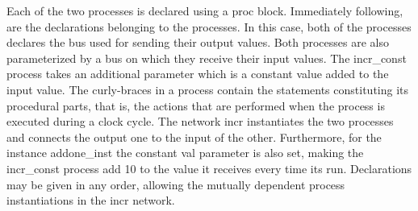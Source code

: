Each of the two processes is declared using a {\ttfamily proc}
block. Immediately following, are the declarations belonging to the
processes. In this case, both of the processes declares the bus used for sending
their output values. Both processes are also parameterized by a bus on which
they receive their input values. The {\ttfamily incr\_const} process takes an
additional parameter which is a constant value added to the input value. The
curly-braces in a process contain the statements constituting its procedural
parts, that is, the actions that are performed when the process is executed
during a clock cycle. The network {\ttfamily incr} instantiates the two
processes and connects the output one to the input of the other. Furthermore,
for the instance {\ttfamily addone\_inst} the constant {\ttfamily val}
parameter is also set, making the {\ttfamily incr\_const} process add 10 to the
value it receives every time its run. Declarations may be given in any order,
allowing the mutually dependent process instantiations in the {\ttfamily incr}
network.








